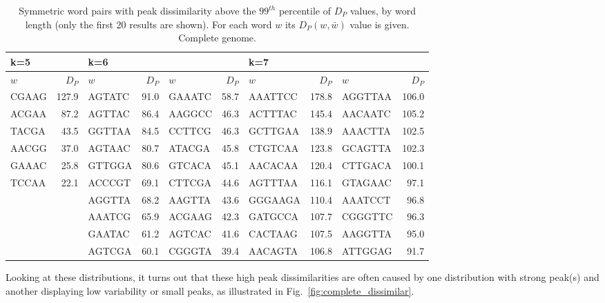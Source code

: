 \documentclass[review,12pt]{elsarticle}
\begin{document}
\begin{table}[htbp]
\centering
\caption{Symmetric word pairs with peak
  dissimilarity above the $99^{th}$ percentile
	of $D_P$ values, by word length (only the
	first 20 results are shown). For each word
	$w$ its $D_P(w,\bar{w})$ value is given.
	Complete genome.}
\renewcommand{\arraystretch}{1.2}
\setlength\tabcolsep{2pt}
\scriptsize
\begin{tabular}{|lr|lrlr|lrlr|}
\hline
  k=5 & & k=6 & & & & k=7 & & & \\
\hline
  $w$ & $D_P$ & $w$ & $D_P$ & $w$ & $D_P$ &
	$w$ & $D_P$ & $w$ & $D_P$ \\
\hline
    CGAAG  & 127.9  & AGTATC & 91.0   & GAAATC & 58.7   & AAATTCC & 178.8  & AGGTTAA & 106.0 \\
    ACGAA  & 87.2   & AGTTAC & 86.4   & AAGGCC & 46.3   & ACTTTAC & 145.4  & AACAATC & 105.2 \\
    TACGA  & 43.5   & GGTTAA & 84.5   & CCTTCG & 46.3   & GCTTGAA & 138.9  & AAACTTA & 102.5 \\
    AACGG  & 37.0   & AGTAAC & 80.7   & ATACGA & 45.8   & CTGTCAA & 123.8  & GCAGTTA & 102.3 \\
    GAAAC  & 25.8   & GTTGGA & 80.6   & GTCACA & 45.1   & AACACAA & 120.4  & CTTGACA & 100.1 \\
    TCCAA  & 22.1   & ACCCGT & 69.1   & CTTCGA & 44.6   & AGTTTAA & 116.1  & GTAGAAC & 97.1 \\
           &        & AGGTTA & 68.2   & AAGTTA & 43.6   & GGGAAGA & 110.4  & AAATCCT & 96.8 \\
           &        & AAATCG & 65.9   & ACGAAG & 42.3   & GATGCCA & 107.7  & CGGGTTC & 96.3 \\
           &        & GAATAC & 61.2   & AGTCAC & 41.6   & CACTAAG & 107.5  & AAGGTTA & 95.0 \\
           &        & AGTCGA & 60.1   & CGGGTA & 39.4   & AACAGTA & 106.8  & ATTGGAG & 91.7 \\
\hline
\end{tabular}
\label{tab:list_complete}
\end{table}

Looking at these distributions, it turns out
that these high peak dissimilarities are
often caused by one distribution with strong
peak(s) and another displaying low variability
or small peaks, as illustrated
in Fig.~\ref{fig:complete_dissimilar}.
\end{document}
